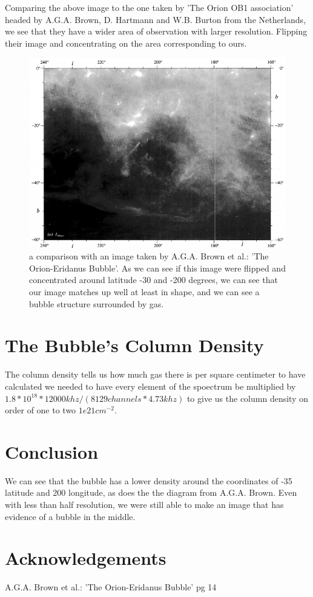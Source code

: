 \documentclass[12 pt]{article}
\begin{document}
Comparing the above image to the one taken by 'The Orion OB1
association' headed by A.G.A. Brown, D. Hartmann and W.B. Burton from
the Netherlands,  we see that they have a wider area of observation with
larger resolution. Flipping their image and concentrating on the area
corresponding to ours. 

\begin{figure}[H]
\centering
\includegraphics[scale=.6]{actual orion.png}
\caption{a comparison with an image taken by A.G.A. Brown et al.: 'The
  Orion-Eridanus Bubble'. As we can see if this image were flipped and
  concentrated around latitude -30 and -200 degrees, we can see that our
image matches up well at least in shape, and we can see a bubble
structure surrounded by gas.}
\label{actualorion}
\end{figure}

\section*{The Bubble's Column Density}
The column density tells us how much gas there is per square centimeter 
to have calculated we needed to have every element of the spoectrum be
multiplied by $1.8*10^{18}*12000khz/(8129 channels*4.73khz)$ to give us
the column density on order of one to two $1e21 cm^{-2}$.
\section{Conclusion}
We can see that the bubble has a lower density around the coordinates of
-35 latitude and 200 longitude,  as does the the diagram from
A.G.A. Brown. Even with less than half resolution, we were still able to
make an image that has evidence of a bubble in the middle. 

\section*{Acknowledgements}
A.G.A. Brown et al.: 'The
  Orion-Eridanus Bubble' pg 14
\end{document}
